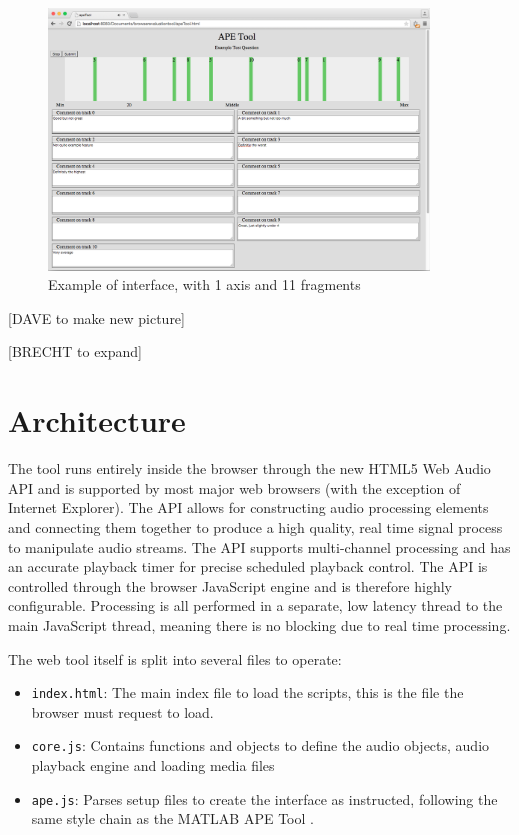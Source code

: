 \documentclass{article}
\begin{document}
\begin{figure}[htbp]
\begin{center}
\includegraphics[width=0.9\textwidth]{interface.png}
\caption{Example of interface, with 1 axis and 11 fragments}
\label{fig:interface}
\end{center}
\end{figure}
[DAVE to make new picture]

[BRECHT to expand]



\section{Architecture}\label{sec:architecture} %

The tool runs entirely inside the browser through the new HTML5 Web Audio API and is supported by most major web browsers (with the exception of Internet Explorer). The API allows for constructing audio processing elements and connecting them together to produce a high quality, real time signal process to manipulate audio streams. The API supports multi-channel processing and has an accurate playback timer for precise scheduled playback control. The API is controlled through the browser JavaScript engine and is therefore highly configurable. Processing is all performed in a separate, low latency thread to the main JavaScript thread, meaning there is no blocking due to real time processing. 

The web tool itself is split into several files to operate:
\begin{itemize}
\item \texttt{index.html}: The main index file to load the scripts, this is the file the browser must request to load.
\item \texttt{core.js}: Contains functions and objects to define the audio objects, audio playback engine and loading media files
\item \texttt{ape.js}: Parses setup files to create the interface as instructed, following the same style chain as the MATLAB APE Tool \cite{deman2014b}.
\end{itemize}
\end{document}

